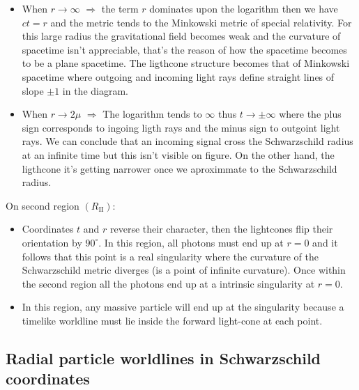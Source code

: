 \documentclass[letterpaper,11pt,onecolumn]{article}
\begin{document}
\begin{itemize}
\item When $r\rightarrow \infty$ $\Rightarrow$ the term $r$ dominates upon the logarithm then we have $ct=r$ and the metric tends to the Minkowski metric of special relativity. For this large radius the gravitational field becomes weak and the curvature of spacetime isn't appreciable, that's the reason of how the spacetime becomes to be a plane spacetime. The ligthcone structure becomes that of Minkowski spacetime where outgoing and incoming light rays define straight lines of slope $\pm1$ in the diagram.

\item When $r\rightarrow 2\mu$ $\Rightarrow$ The logarithm tends to $\infty$ thus $t\rightarrow \pm\infty$ where the plus sign corresponds to ingoing ligth rays and the minus sign to outgoint light rays. We can conclude that an incoming signal cross the Schwarzschild radius at an infinite time but this isn't visible on figure. On the other hand, the ligthcone it's getting narrower once we aproximmate to the Schwarzschild radius.\\

\end{itemize}
On second region $(R_{\mathrm{II}})$:
\begin{itemize}
  \item  Coordinates $t$ and $r$ reverse their character, then the lightcones flip their orientation by $90^{\circ}$. In this region, all photons must end up at $r=0$ and it follows that this point is a real singularity where the curvature of the Schwarzschild metric diverges (is a point of infinite curvature). Once within the second region  all the photons end up at a intrinsic singularity at $r=0$.
  \item In this region, any massive particle
will end up at the singularity because a timelike worldline must lie inside the forward light-cone at each point.

\end{itemize}
\subsection{Radial particle worldlines in Schwarzschild coordinates}
\end{document}
